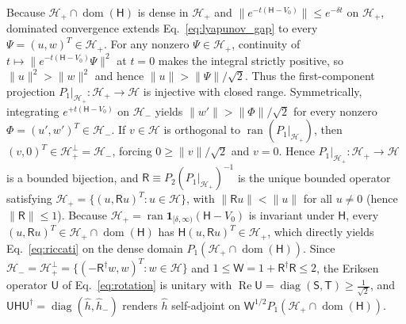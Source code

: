 \documentclass[aps,prd,onecolumn,tightenlines,nofootinbib,notitlepage,11pt,floatfix]{revtex4-2}
\theoremstyle{indentedtheorem}
\begin{document}
Because $\mathcal{H}_+\cap\operatorname{dom}(\mathsf{H})$ is dense in $\mathcal{H}_+$ and $\|e^{-t(\mathsf{H}-V_0)}\|\le e^{-\delta t}$ on $\mathcal{H}_+$, dominated convergence extends Eq.~\eqref{eq:lyapunov_gap} to every $\Psi=(u,w)^T\in\mathcal{H}_+$. For any nonzero $\Psi\in\mathcal{H}_+$, continuity of $t\mapsto\|e^{-t(\mathsf{H}-V_0)}\Psi\|^2$ at $t=0$ makes the integral strictly positive, so $\|u\|^2>\|w\|^2$ and hence $\|u\|>\|\Psi\|/\sqrt{2}$. Thus the first-component projection $P_1|_{\mathcal{H}_+}:\mathcal{H}_+\to\mathcal{H}$ is injective with closed range. Symmetrically, integrating $e^{+t(\mathsf{H}-V_0)}$ on $\mathcal{H}_-$ yields $\|w'\|>\|\Phi\|/\sqrt{2}$ for every nonzero $\Phi=(u',w')^T\in\mathcal{H}_-$. If $v\in\mathcal{H}$ is orthogonal to $\operatorname{ran}(P_1|_{\mathcal{H}_+})$, then $(v,0)^T\in\mathcal{H}_+^\perp=\mathcal{H}_-$, forcing $0\ge\|v\|/\sqrt{2}$ and $v=0$. Hence $P_1|_{\mathcal{H}_+}:\mathcal{H}_+\to\mathcal{H}$ is a bounded bijection, and $\mathsf{R}\equiv P_2(P_1|_{\mathcal{H}_+})^{-1}$ is the unique bounded operator satisfying $\mathcal{H}_+=\{(u,\mathsf{R}u)^T:u\in\mathcal{H}\}$, with $\|\mathsf{R}u\|<\|u\|$ for all $u\neq 0$ (hence $\|\mathsf{R}\|\le 1$). Because $\mathcal{H}_+ = \operatorname{ran}\mathbf{1}_{[\delta,\infty)}(\mathsf{H}-V_0)$ is invariant under $\mathsf{H}$, every $(u,\mathsf{R}u)^T\in\mathcal{H}_+\cap\operatorname{dom}(\mathsf{H})$ has $\mathsf{H}(u,\mathsf{R}u)^T\in\mathcal{H}_+$, which directly yields Eq.~\eqref{eq:riccati} on the dense domain $P_1(\mathcal{H}_+\cap\operatorname{dom}(\mathsf{H}))$. Since $\mathcal{H}_-=\mathcal{H}_+^\perp=\{(-\mathsf{R}^\dagger w,w)^T:w\in\mathcal{H}\}$ and $1\le\mathsf{W}=1+\mathsf{R}^\dagger\mathsf{R}\le 2$, the Eriksen operator $\mathsf{U}$ of Eq.~\eqref{eq:rotation} is unitary with $\operatorname{Re}\mathsf{U}=\operatorname{diag}(\mathsf{S},\mathsf{T})\ge\tfrac{1}{\sqrt{2}}$, and $\mathsf{U}\mathsf{H}\mathsf{U}^\dagger = \operatorname{diag}(\hat{h},\hat{h}_-)$ renders $\hat{h}$ self-adjoint on $\mathsf{W}^{1/2}P_1(\mathcal{H}_+\cap\operatorname{dom}(\mathsf{H}))$.
\end{document}
